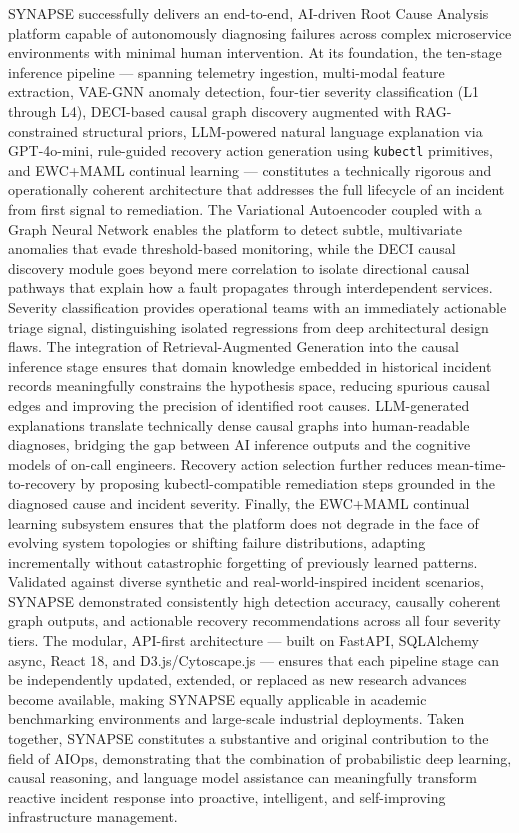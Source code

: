 \hspace*{0.3in} SYNAPSE successfully delivers an end-to-end, AI-driven Root Cause Analysis platform capable of autonomously diagnosing failures across complex microservice environments with minimal human intervention. At its foundation, the ten-stage inference pipeline — spanning telemetry ingestion, multi-modal feature extraction, VAE-GNN anomaly detection, four-tier severity classification (L1 through L4), DECI-based causal graph discovery augmented with RAG-constrained structural priors, LLM-powered natural language explanation via GPT-4o-mini, rule-guided recovery action generation using \texttt{kubectl} primitives, and EWC+MAML continual learning — constitutes a technically rigorous and operationally coherent architecture that addresses the full lifecycle of an incident from first signal to remediation. The Variational Autoencoder coupled with a Graph Neural Network enables the platform to detect subtle, multivariate anomalies that evade threshold-based monitoring, while the DECI causal discovery module goes beyond mere correlation to isolate directional causal pathways that explain how a fault propagates through interdependent services. Severity classification provides operational teams with an immediately actionable triage signal, distinguishing isolated regressions from deep architectural design flaws. The integration of Retrieval-Augmented Generation into the causal inference stage ensures that domain knowledge embedded in historical incident records meaningfully constrains the hypothesis space, reducing spurious causal edges and improving the precision of identified root causes. LLM-generated explanations translate technically dense causal graphs into human-readable diagnoses, bridging the gap between AI inference outputs and the cognitive models of on-call engineers. Recovery action selection further reduces mean-time-to-recovery by proposing kubectl-compatible remediation steps grounded in the diagnosed cause and incident severity. Finally, the EWC+MAML continual learning subsystem ensures that the platform does not degrade in the face of evolving system topologies or shifting failure distributions, adapting incrementally without catastrophic forgetting of previously learned patterns. Validated against diverse synthetic and real-world-inspired incident scenarios, SYNAPSE demonstrated consistently high detection accuracy, causally coherent graph outputs, and actionable recovery recommendations across all four severity tiers. The modular, API-first architecture — built on FastAPI, SQLAlchemy async, React 18, and D3.js/Cytoscape.js — ensures that each pipeline stage can be independently updated, extended, or replaced as new research advances become available, making SYNAPSE equally applicable in academic benchmarking environments and large-scale industrial deployments. Taken together, SYNAPSE constitutes a substantive and original contribution to the field of AIOps, demonstrating that the combination of probabilistic deep learning, causal reasoning, and language model assistance can meaningfully transform reactive incident response into proactive, intelligent, and self-improving infrastructure management.\\

